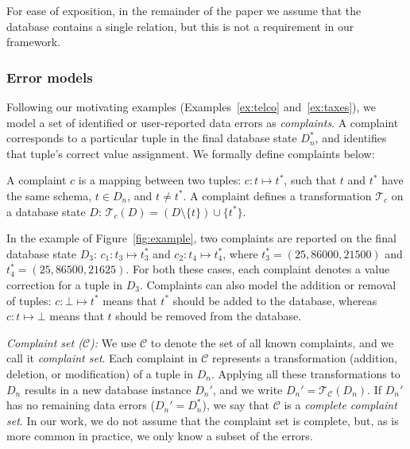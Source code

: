 For ease of exposition, in the remainder of the paper we assume that the
database contains a single relation, but this is not a requirement in our
framework.


\subsubsection*{Error models}

Following our motivating examples (Examples~\ref{ex:telco}
and~\ref{ex:taxes}), we model a set of identified or user-reported
data errors as \emph{complaints}. A complaint corresponds to a
particular tuple in the final database state $D_n^*$, and identifies
that tuple's correct value assignment. We formally define complaints
below:

\begin{definition}[Complaint]
    A complaint $c$ is a mapping between two tuples: $c: t\mapsto t^*$, such that $t$ and $t^*$ have the same schema, $t\in D_n$, and $t\neq t^*$. A complaint defines a
    transformation $\mathcal{T}_c$ on a database state $D$: $\mathcal{T}_c(D)
    = (D\setminus\{t\})\cup\{t^*\}$.
\end{definition}

In the example of Figure~\ref{fig:example}, two complaints are reported on the final database state $D_3$: 
$c_1: t_3\mapsto t_3^*$ and
$c_2: t_4\mapsto t_4^*$, where $t_3^*=(25,86000,21500)$
and $t_4^*=(25,86500,21625)$.  For both these cases, each complaint denotes a value correction for a tuple in $D_3$.  Complaints can also model the addition or removal of tuples: $c: \bot\mapsto t^*$ means that $t^*$ should be added to the database, whereas $c: t\mapsto \bot$
means that $t$ should be removed from the database.


% 
\emph{Complaint set ($\mathcal{C}$):}
We use $\mathcal{C}$ to denote the set of all known complaints, and we call it
\emph{complaint set}. Each complaint in $\mathcal{C}$ represents a
transformation (addition, deletion, or modification) of a tuple in $D_n$.
Applying all these transformations to $D_n$ results in a new database instance
$D_n'$, and we write $D_n'=\mathcal{T}_\mathcal{C}(D_n)$. If $D_n'$ has no
remaining data errors ($D_n'=D_n^*$), we say that $\mathcal{C}$ is a
\emph{complete complaint set}.
In our work, we do not assume that the complaint set is complete, but, as is
more common in practice, we only know a subset of the errors.

